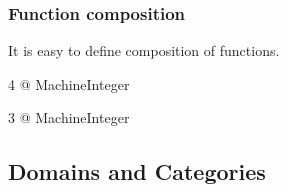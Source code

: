 \begin{comment}
<<Functions2>>=
aldor -gloop
baz(
  f: MachineInteger -> MachineInteger,
  n: MachineInteger
): MachineInteger == {
  f f n
}
import from MachineInteger
baz(factorial, 3)
#quit
@
\end{comment}

















\begin{frame}[fragile]
  \frametitle<presentation>{Function composition}
  It is easy to define composition of functions.
\begin{myverbatim}




4 @ MachineInteger

3 @ MachineInteger
\end{myverbatim}
\end{frame}

\begin{comment}
<<Functions3>>=
aldor -gloop
macro I == MachineInteger;
import from I;
double(i: I): I == i+i;
succ(i: I): I == i+1;
(f: I->I) * (g: I->I): I->I == (i: I): I +-> f g i;
foo := double * succ;
bar := succ * double;
foo 1
bar 1
#quit
@
\end{comment}















\subsection{Domains and Categories}


